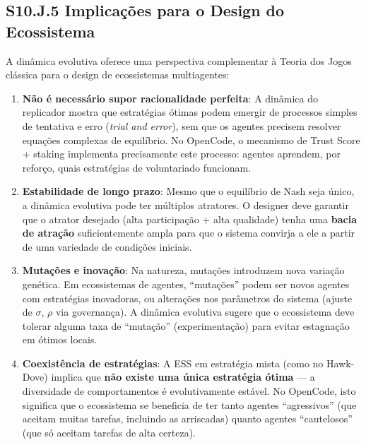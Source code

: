 \subsection*{S10.J.5 Implicações para o Design do Ecossistema}

A dinâmica evolutiva oferece uma perspectiva complementar à Teoria dos Jogos clássica para o design de ecossistemas multiagentes:

\begin{enumerate}
    \item \textbf{Não é necessário supor racionalidade perfeita}: A dinâmica do replicador mostra que estratégias ótimas podem emergir de processos simples de tentativa e erro (\textit{trial and error}), sem que os agentes precisem resolver equações complexas de equilíbrio. No OpenCode, o mecanismo de Trust Score + staking implementa precisamente este processo: agentes aprendem, por reforço, quais estratégias de voluntariado funcionam.
    
    \item \textbf{Estabilidade de longo prazo}: Mesmo que o equilíbrio de Nash seja único, a dinâmica evolutiva pode ter múltiplos atratores. O designer deve garantir que o atrator desejado (alta participação + alta qualidade) tenha uma \textbf{bacia de atração} suficientemente ampla para que o sistema convirja a ele a partir de uma variedade de condições iniciais.
    
    \item \textbf{Mutações e inovação}: Na natureza, mutações introduzem nova variação genética. Em ecossistemas de agentes, ``mutações'' podem ser novos agentes com estratégias inovadoras, ou alterações nos parâmetros do sistema (ajuste de $\sigma$, $\rho$ via governança). A dinâmica evolutiva sugere que o ecossistema deve tolerar alguma taxa de ``mutação'' (experimentação) para evitar estagnação em ótimos locais.
    
    \item \textbf{Coexistência de estratégias}: A ESS em estratégia mista (como no Hawk-Dove) implica que \textbf{não existe uma única estratégia ótima} --- a diversidade de comportamentos é evolutivamente estável. No OpenCode, isto significa que o ecossistema se beneficia de ter tanto agentes ``agressivos'' (que aceitam muitas tarefas, incluindo as arriscadas) quanto agentes ``cautelosos'' (que só aceitam tarefas de alta certeza).
\end{enumerate}


